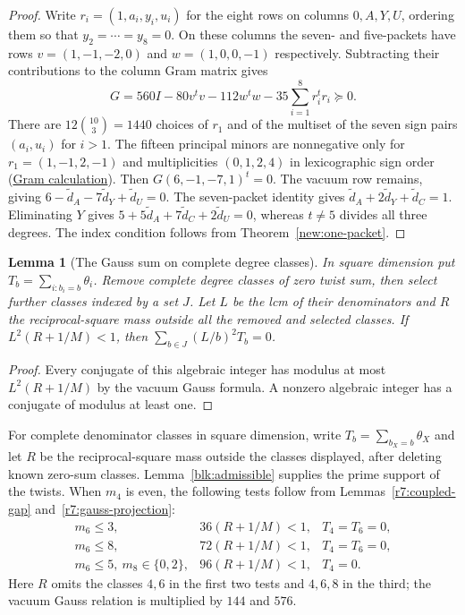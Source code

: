 \documentclass[11pt]{amsart}
\numberwithin{equation}{section}
\newtheorem{lemma}[theorem]{Lemma}
\theoremstyle{definition}
\theoremstyle{plain}
\newcommand{\supfile}[2]{\href{run:rank-bound-supplement/#1}{#2}}
\begin{document}
\begin{proof}
Write $r_i=(1,a_i,y_i,u_i)$ for the eight rows on columns
$0,A,Y,U$, ordering them so that $y_2=\cdots=y_8=0$. On these
columns the seven- and five-packets have rows $v=(1,-1,-2,0)$
and $w=(1,0,0,-1)$ respectively. Subtracting their contributions to the
column Gram matrix gives
\[
 G=560I-80v^tv-112w^tw-35\sum_{i=1}^8r_i^tr_i\succeq0.
\]
There are $12\binom{10}3=1440$ choices of $r_1$ and of the multiset of
the seven sign pairs $(a_i,u_i)$ for $i>1$. The fifteen principal
minors are nonnegative only for $r_1=(1,-1,2,-1)$ and multiplicities
$(0,1,2,4)$ in lexicographic sign order
(\supfile{arithmetic/gram_packets.py}{Gram calculation}).
Then $G(6,-1,-7,1)^t=0$. The vacuum row remains, giving
$6-\widetilde d_A-7\widetilde d_Y+\widetilde d_U=0$. The seven-packet
identity gives $\widetilde d_A+2\widetilde d_Y+\widetilde d_C=1$.
Eliminating $Y$ gives $5+5\widetilde d_A+7\widetilde d_C+2\widetilde d_U=0$,
whereas $t\ne5$ divides all three degrees. The index condition follows
from Theorem~\ref{new:one-packet}.
\end{proof}

\begin{lemma}[The Gauss sum on complete degree classes]\label{new:partial-gauss}
In square dimension put $T_b=\sum_{i:b_i=b}\theta_i$.
Remove complete degree classes of zero twist sum, then select further
classes indexed by a set $J$. Let $L$ be the lcm of their denominators
and $R$ the reciprocal-square mass outside all the removed and selected
classes. If $L^2(R+1/M)<1$, then
$\sum_{b\in J}(L/b)^2T_b=0$.
\end{lemma}
\begin{proof}
Every conjugate of this algebraic integer has modulus at most
$L^2(R+1/M)$ by the vacuum Gauss formula. A nonzero algebraic
integer has a conjugate of modulus at least one.
\end{proof}
For complete denominator classes in square dimension, write $T_b=\sum_{b_X=b}\theta_X$ and let $R$ be the reciprocal-square mass outside the classes displayed, after deleting known zero-sum classes. Lemma~\ref{blk:admissible} supplies the prime support of the twists. When $m_4$ is even, the following tests follow from Lemmas~\ref{r7:coupled-gap} and~\ref{r7:gauss-projection}:
\[
 \begin{array}{lll}
 m_6\le3,&36(R+1/M)<1,&T_4=T_6=0,\\
 m_6\le8,&72(R+1/M)<1,&T_4=T_6=0,\\
 m_6\le5,\ m_8\in\{0,2\},&96(R+1/M)<1,&T_4=0.
 \end{array}
\]
Here $R$ omits the classes $4,6$ in the first two tests and $4,6,8$ in the third; the vacuum Gauss relation is multiplied by $144$ and $576$.
\end{document}
